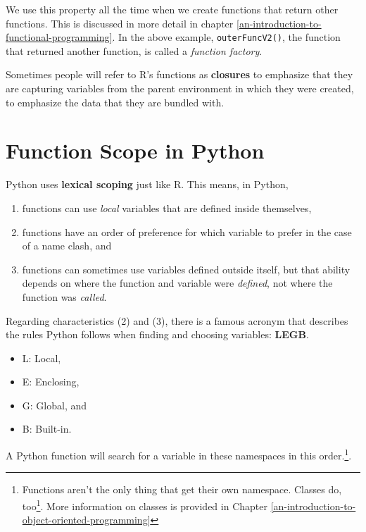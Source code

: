 \documentclass[
  12pt,
  krantz2]{krantz}
\providecommand{\tightlist}{%
  \setlength{\itemsep}{0pt}\setlength{\parskip}{0pt}}
\renewcommand{\href}[2]{#2\footnote{\url{#1}}}
\begin{document}
We use this property all the time when we create functions that return other functions. This is discussed in more detail in chapter \ref{an-introduction-to-functional-programming}. In the above example, \texttt{outerFuncV2()}, the function that returned another function, is called a \emph{function factory}.

\begin{rmd-details}
Sometimes people will refer to R's functions as \textbf{closures} to emphasize that they are capturing variables from the parent environment in which they were created, to emphasize the data that they are bundled with.

\end{rmd-details}

\hypertarget{function-scope-in-python}{%
\section{Function Scope in Python}\label{function-scope-in-python}}

Python uses \textbf{lexical scoping} just like R. This means, in Python,

\begin{enumerate}
\def\labelenumi{\arabic{enumi}.}
\tightlist
\item
  functions can use \emph{local} variables that are defined inside themselves,\\
\item
  functions have an order of preference for which variable to prefer in the case of a name clash, and
\item
  functions can sometimes use variables defined outside itself, but that ability depends on where the function and variable were \emph{defined}, not where the function was \emph{called}.
\end{enumerate}

Regarding characteristics (2) and (3), there is a famous acronym that describes the rules Python follows when finding and choosing variables: \textbf{LEGB}.

\begin{itemize}
\tightlist
\item
  L: Local,
\item
  E: Enclosing,
\item
  G: Global, and
\item
  B: Built-in.
\end{itemize}

A Python function will search for a variable in these namespaces in this order.\footnote{Functions aren't the only thing that get their own namespace. \href{https://docs.python.org/3/tutorial/classes.html\#a-first-look-at-classes}{Classes do, too}. More information on classes is provided in Chapter \ref{an-introduction-to-object-oriented-programming}}.
\end{document}
